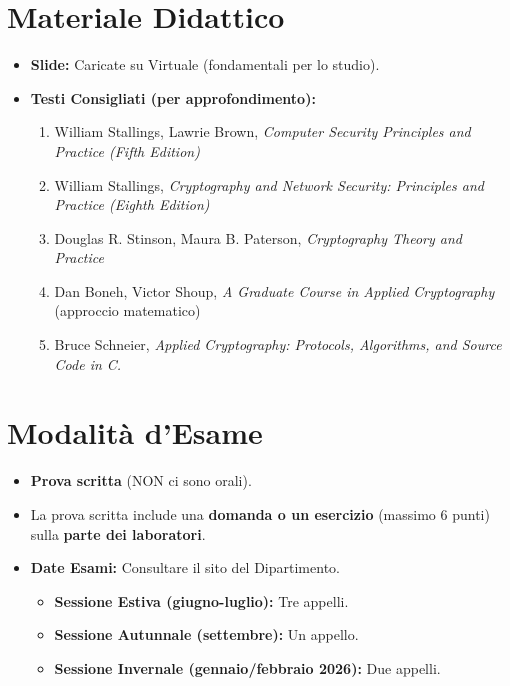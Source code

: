 \documentclass{article}
\begin{document}
\section{Materiale Didattico}
\begin{itemize}
    \item \textbf{Slide:} Caricate su Virtuale (fondamentali per lo studio).
    \item \textbf{Testi Consigliati (per approfondimento):}
    \begin{enumerate}
        \item William Stallings, Lawrie Brown, \textit{Computer Security Principles and Practice (Fifth Edition)}
        \item William Stallings, \textit{Cryptography and Network Security: Principles and Practice (Eighth Edition)}
        \item Douglas R. Stinson, Maura B. Paterson, \textit{Cryptography Theory and Practice}
        \item Dan Boneh, Victor Shoup, \textit{A Graduate Course in Applied Cryptography} (approccio matematico)
        \item Bruce Schneier, \textit{Applied Cryptography: Protocols, Algorithms, and Source Code in C.}
    \end{enumerate}
\end{itemize}

\section{Modalità d'Esame}
\begin{itemize}
    \item \textbf{Prova scritta} (NON ci sono orali).
    \item La prova scritta include una \textbf{domanda o un esercizio} (massimo 6 punti) sulla \textbf{parte dei laboratori}.
    \item \textbf{Date Esami:} Consultare il sito del Dipartimento.
    \begin{itemize}
        \item \textbf{Sessione Estiva (giugno-luglio):} Tre appelli.
        \item \textbf{Sessione Autunnale (settembre):} Un appello.
        \item \textbf{Sessione Invernale (gennaio/febbraio 2026):} Due appelli.
    \end{itemize}
\end{itemize}
\end{document}
